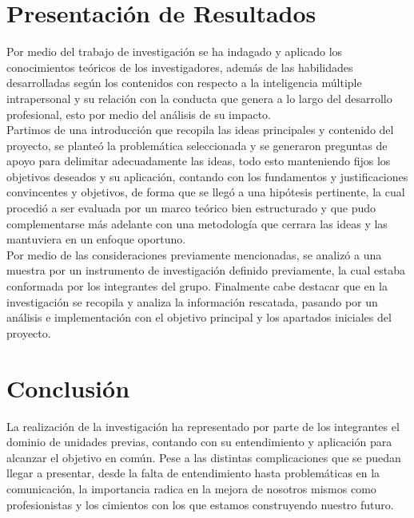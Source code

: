 \section{Presentación de Resultados}
Por medio del trabajo de investigación se ha indagado y aplicado los conocimientos teóricos de los investigadores, además de las habilidades desarrolladas según los contenidos con respecto a la inteligencia múltiple intrapersonal y su relación con la conducta que genera a lo largo del desarrollo profesional, esto por medio del análisis de su impacto.\\
Partimos de una introducción que recopila las ideas principales y contenido del proyecto, se planteó la problemática seleccionada y se generaron preguntas de apoyo para delimitar adecuadamente las ideas, todo esto manteniendo fijos los objetivos deseados y su aplicación, contando con los fundamentos y justificaciones convincentes y objetivos, de forma que se llegó a una hipótesis pertinente, la cual procedió a ser evaluada por un marco teórico bien estructurado y que pudo complementarse más adelante con una metodología que cerrara las ideas y las mantuviera en un enfoque oportuno.\\
Por medio de las consideraciones previamente mencionadas, se analizó a una muestra por un instrumento de investigación definido previamente, la cual estaba conformada por los integrantes del grupo. Finalmente cabe destacar que en la investigación se recopila y analiza la información rescatada, pasando por un análisis e implementación con el objetivo principal y los apartados iniciales del proyecto.\\ 
\section{Conclusión}
La realización de la investigación ha representado por parte de los integrantes
el dominio de unidades previas, contando con su entendimiento y aplicación para
alcanzar el objetivo en común. Pese a las distintas complicaciones que se puedan
llegar a presentar, desde la falta de entendimiento hasta problemáticas en la
comunicación, la importancia radica en la mejora de nosotros mismos como
profesionistas y los cimientos con los que estamos construyendo nuestro futuro.
